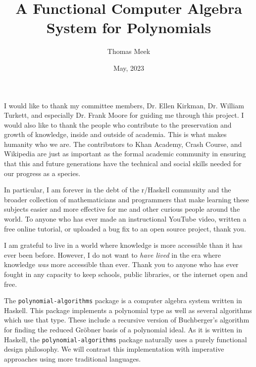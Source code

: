 \documentclass[MS, xcolor=dvipsnames]{wfuthesis}
\theoremstyle{definition}
\begin{document}
\title{A Functional Computer Algebra System for Polynomials}
\author{Thomas Meek}


\date{May, 2023}

\maketitle

\clearpage


\acknowledgments

I would like to thank my committee members, Dr. Ellen Kirkman, Dr. William Turkett, and especially Dr. Frank Moore for guiding me through this project. I would also like to thank the people who contribute to the preservation and growth of knowledge, inside and outside of academia. This is what makes humanity who we are. The contributors to Khan Academy, Crash Course, and Wikipedia are just as important as the formal academic community in ensuring that this and future generations have the technical and social skills needed for our progress as a species. \par
In particular, I am forever in the debt of the r/Haskell community and the broader collection of mathematicians and programmers that make learning these subjects easier and more effective for me and other curious people around the world. To anyone who has ever made an instructional YouTube video, written a free online tutorial, or uploaded a bug fix to an open source project, thank you. \par
I am grateful to live in a world where knowledge is more accessible than it has ever been before. However, I do not want to \emph{have lived} in the era where knowledge \emph{was} more accessible than ever. Thank you to anyone who has ever fought in any capacity to keep schools, public libraries, or the internet open and free.

\tableofcontents

\abstract


The \lstinline{polynomial-algorithms} package is a computer algebra system written in Haskell. This package implements a polynomial type as well as several algorithms which use that type. These include a recursive version of Buchberger's algorithm for finding the reduced Gr\"obner basis of a polynomial ideal. As it is written in Haskell, the \lstinline{polynomial-algorithms} package naturally uses a purely functional design philosophy. We will contrast this implementation with imperative approaches using more traditional languages.
\end{document}

